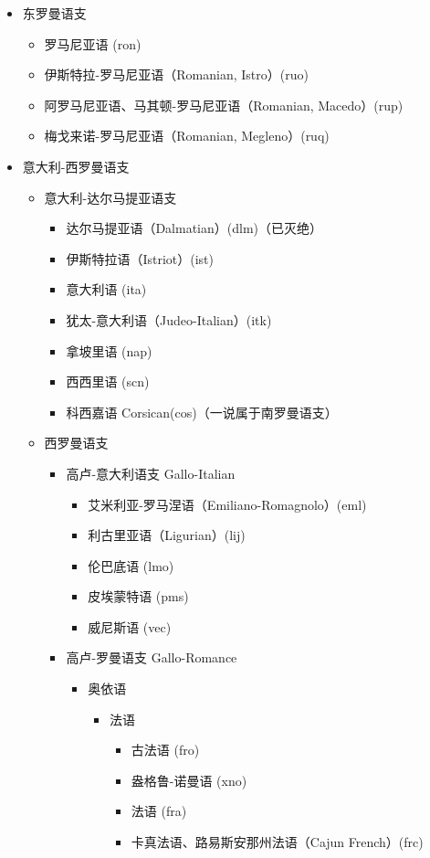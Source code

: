 \documentclass[UTF8,a4paper,titlepage,10pt]{report}
\begin{document}
\begin{enumerate}
\begin{itemize}
\item 东罗曼语支
\begin{itemize}
\item 罗马尼亚语 (ron)
\item 伊斯特拉-罗马尼亚语（Romanian, Istro）(ruo)
\item 阿罗马尼亚语、马其顿-罗马尼亚语（Romanian, Macedo）(rup)
\item 梅戈来诺-罗马尼亚语（Romanian, Megleno）(ruq)
\end{itemize}
\item 意大利-西罗曼语支
\begin{itemize}
\item 意大利-达尔马提亚语支
\begin{itemize}
\item 达尔马提亚语（Dalmatian）(dlm)（已灭绝）
\item 伊斯特拉语（Istriot）(ist)
\item 意大利语 (ita)
\item 犹太-意大利语（Judeo-Italian）(itk)
\item 拿坡里语 (nap)
\item 西西里语 (scn)
\item 科西嘉语 Corsican(cos)（一说属于南罗曼语支）
\end{itemize}
\item 西罗曼语支
\begin{itemize}
\item 高卢-意大利语支 Gallo-Italian
\begin{itemize}
\item 艾米利亚-罗马涅语（Emiliano-Romagnolo）(eml)
\item 利古里亚语（Ligurian）(lij)
\item 伦巴底语 (lmo)
\item 皮埃蒙特语 (pms)
\item 威尼斯语 (vec)
\end{itemize}
\item 高卢-罗曼语支 Gallo-Romance
\begin{itemize}
\item 奥依语
\begin{itemize}
\item 法语
\begin{itemize}
\item 古法语 (fro)
\item 盎格鲁-诺曼语 (xno)
\item 法语 (fra)
\item 卡真法语、路易斯安那州法语（Cajun French）(frc)

\end{itemize}
\end{itemize}
\end{itemize}
\end{itemize}
\end{itemize}
\end{itemize}
\end{enumerate}
\end{document}
